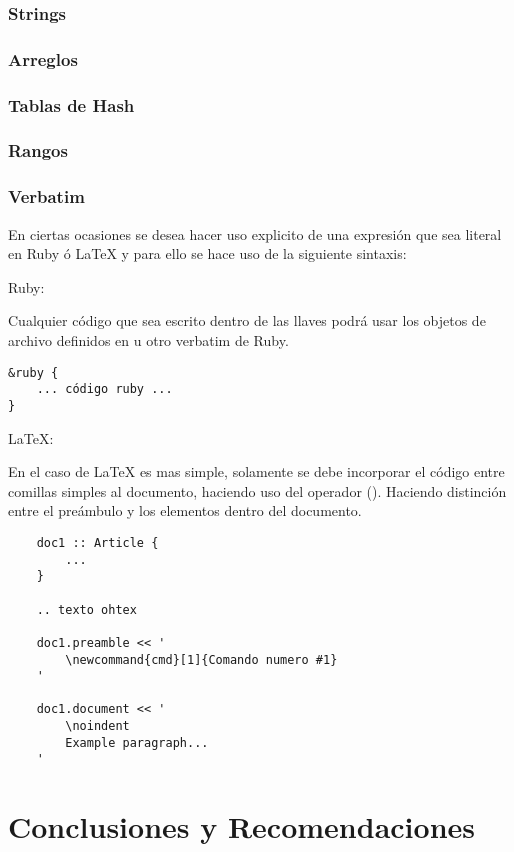 \documentclass[12pt,letterpaper,titlepage,oneside,openright]{book}
\newcommand{\OhTeX}{%
    \makebox[0.76em][c]{O}%
    \makebox[0.25em][c]{%
        \raisebox{0.14em}[0em][0em]{%
            \fontsize{0.5em}{0cm}%
                \selectfont H%
        }%
    }%
    \makebox[1.35em][c]{\TeX}%
}
\newcommand{\latex}{\LaTeX\xspace}
\newcommand{\ohtex}{\OhTeX\xspace}
\newcommand{\ttcode}[1]{(\texttt{#1})}
\begin{document}
\subsection{Strings}

\subsection{Arreglos}

\subsection{Tablas de Hash}

\subsection{Rangos}

\subsection{Verbatim}

En ciertas ocasiones se desea hacer uso explicito de una expresión que sea
literal en Ruby ó \latex y para ello se hace uso de la siguiente sintaxis:

Ruby:

Cualquier código que sea escrito dentro de las llaves podrá usar los objetos de
archivo definidos en \ohtex u otro verbatim de Ruby.

\begin{verbatim}
&ruby {
    ... código ruby ...
}
\end{verbatim}

\LaTeX:

En el caso de \latex es mas simple, solamente se debe incorporar el código entre
comillas simples al documento, haciendo uso del operador \ttcode{\<\<}. Haciendo
distinción entre el preámbulo y los elementos dentro del documento.

\begin{center}
\begin{lstlisting}
    doc1 :: Article {
        ...
    }

    .. texto ohtex

    doc1.preamble << '
        \newcommand{cmd}[1]{Comando numero #1}
    '

    doc1.document << '
        \noindent
        Example paragraph...
    '
\end{lstlisting}
\end{center}


\chapter{Conclusiones y Recomendaciones}
\lipsum[1-2]
\end{document}
